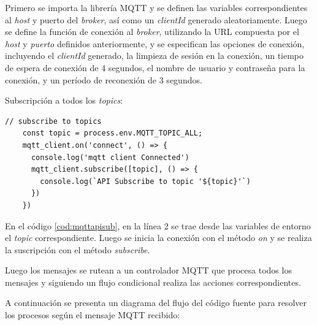 Primero se importa la librería MQTT y se definen las variables correspondientes al \textit{host} y puerto del \textit{broker}, así como un \textit{clientId} generado aleatoriamente. Luego se define la función de conexión al \textit{broker}, utilizando la URL compuesta por el \textit{host} y \textit{puerto} definidos anteriormente, y se especifican las opciones de conexión, incluyendo el \textit{clientId} generado, la limpieza de sesión en la conexión, un tiempo de espera de conexión de 4 segundos, el nombre de usuario y contraseña para la conexión, y un período de reconexión de 3 segundos.


Subscripción a todos los \textit{topics}:

\begin{lstlisting}[label=cod:mqttapisub,caption=Subscripción a \textit{topics} en API REST.]
// subscribe to topics
    const topic = process.env.MQTT_TOPIC_ALL;
    mqtt_client.on('connect', () => {
      console.log('mqtt client Connected')
      mqtt_client.subscribe([topic], () => {
        console.log(`API Subscribe to topic '${topic}'`)
      })
    })
\end{lstlisting}

En el código \ref{cod:mqttapisub}, en la línea 2 se trae desde las variables de entorno el \textit{topic} correspondiente. Luego se inicia la conexión con el método \textit{on} y se realiza la suscripción con el método \textit{subscribe}. 

Luego los mensajes se rutean a un controlador MQTT que procesa todos los mensajes y siguiendo un flujo condicional realiza las acciones correspondientes.

A continuación se presenta un diagrama del flujo del código fuente para resolver los procesos según el mensaje MQTT recibido:

